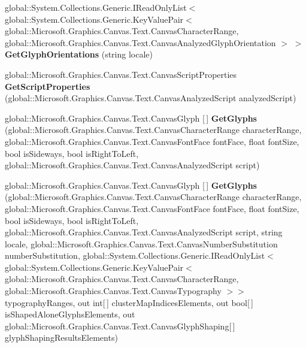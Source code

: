 \begin{DoxyCompactItemize}
\item 
\mbox{\label{interface_microsoft_1_1_graphics_1_1_canvas_1_1_text_1_1_i_canvas_text_analyzer_a47f54cf6a9c8b69d01323558348e4570}} 
global\+::\+System.\+Collections.\+Generic.\+I\+Read\+Only\+List$<$ global\+::\+System.\+Collections.\+Generic.\+Key\+Value\+Pair$<$ global\+::\+Microsoft.\+Graphics.\+Canvas.\+Text.\+Canvas\+Character\+Range, global\+::\+Microsoft.\+Graphics.\+Canvas.\+Text.\+Canvas\+Analyzed\+Glyph\+Orientation $>$ $>$ {\bfseries Get\+Glyph\+Orientations} (string locale)
\item 
\mbox{\label{interface_microsoft_1_1_graphics_1_1_canvas_1_1_text_1_1_i_canvas_text_analyzer_a689cfaece7845a1ac47afa71449b2076}} 
global\+::\+Microsoft.\+Graphics.\+Canvas.\+Text.\+Canvas\+Script\+Properties {\bfseries Get\+Script\+Properties} (global\+::\+Microsoft.\+Graphics.\+Canvas.\+Text.\+Canvas\+Analyzed\+Script analyzed\+Script)
\item 
\mbox{\label{interface_microsoft_1_1_graphics_1_1_canvas_1_1_text_1_1_i_canvas_text_analyzer_ae275ea97283c83f61364e0b52c92e782}} 
global\+::\+Microsoft.\+Graphics.\+Canvas.\+Text.\+Canvas\+Glyph \mbox{[}$\,$\mbox{]} {\bfseries Get\+Glyphs} (global\+::\+Microsoft.\+Graphics.\+Canvas.\+Text.\+Canvas\+Character\+Range character\+Range, global\+::\+Microsoft.\+Graphics.\+Canvas.\+Text.\+Canvas\+Font\+Face font\+Face, float font\+Size, bool is\+Sideways, bool is\+Right\+To\+Left, global\+::\+Microsoft.\+Graphics.\+Canvas.\+Text.\+Canvas\+Analyzed\+Script script)
\item 
\mbox{\label{interface_microsoft_1_1_graphics_1_1_canvas_1_1_text_1_1_i_canvas_text_analyzer_a198843bd363ffbb2a16d85d6439972ce}} 
global\+::\+Microsoft.\+Graphics.\+Canvas.\+Text.\+Canvas\+Glyph \mbox{[}$\,$\mbox{]} {\bfseries Get\+Glyphs} (global\+::\+Microsoft.\+Graphics.\+Canvas.\+Text.\+Canvas\+Character\+Range character\+Range, global\+::\+Microsoft.\+Graphics.\+Canvas.\+Text.\+Canvas\+Font\+Face font\+Face, float font\+Size, bool is\+Sideways, bool is\+Right\+To\+Left, global\+::\+Microsoft.\+Graphics.\+Canvas.\+Text.\+Canvas\+Analyzed\+Script script, string locale, global\+::\+Microsoft.\+Graphics.\+Canvas.\+Text.\+Canvas\+Number\+Substitution number\+Substitution, global\+::\+System.\+Collections.\+Generic.\+I\+Read\+Only\+List$<$ global\+::\+System.\+Collections.\+Generic.\+Key\+Value\+Pair$<$ global\+::\+Microsoft.\+Graphics.\+Canvas.\+Text.\+Canvas\+Character\+Range, global\+::\+Microsoft.\+Graphics.\+Canvas.\+Text.\+Canvas\+Typography $>$$>$ typography\+Ranges, out int\mbox{[}$\,$\mbox{]} cluster\+Map\+Indices\+Elements, out bool\mbox{[}$\,$\mbox{]} is\+Shaped\+Alone\+Glyphs\+Elements, out global\+::\+Microsoft.\+Graphics.\+Canvas.\+Text.\+Canvas\+Glyph\+Shaping\mbox{[}$\,$\mbox{]} glyph\+Shaping\+Results\+Elements)
$$
\end{DoxyCompactItemize}
